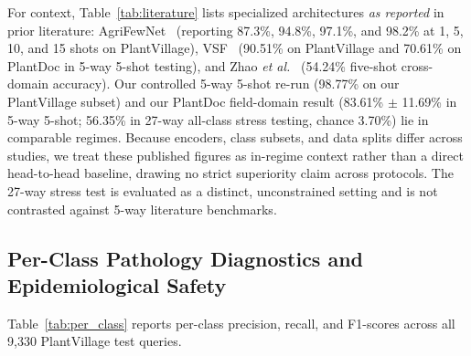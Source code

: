 \documentclass[preprint,12pt]{elsarticle}
\begin{document}
For context, Table~\ref{tab:literature} lists specialized architectures \emph{as reported} in prior literature: AgriFewNet~\cite{babu2025agrifewnet} (reporting 87.3\%, 94.8\%, 97.1\%, and 98.2\% at 1, 5, 10, and 15 shots on PlantVillage), VSF~\cite{zhou2026vsf} (90.51\% on PlantVillage and 70.61\% on PlantDoc in 5-way 5-shot testing), and Zhao \textit{et al.}~\cite{zhao2026lightweight} (54.24\% five-shot cross-domain accuracy). Our controlled 5-way 5-shot re-run (98.77\% on our PlantVillage subset) and our PlantDoc field-domain result (83.61\% $\pm$ 11.69\% in 5-way 5-shot; 56.35\% in 27-way all-class stress testing, chance 3.70\%) lie in comparable regimes. Because encoders, class subsets, and data splits differ across studies, we treat these published figures as in-regime context rather than a direct head-to-head baseline, drawing no strict superiority claim across protocols. The 27-way stress test is evaluated as a distinct, unconstrained setting and is not contrasted against 5-way literature benchmarks.

\subsection{Per-Class Pathology Diagnostics and Epidemiological Safety}
\label{sec:per_class}
Table~\ref{tab:per_class} reports per-class precision, recall, and F1-scores across all 9,330 PlantVillage test queries.
\end{document}
